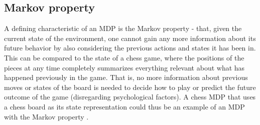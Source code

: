 \subsection{Markov property}

A defining characteristic of an MDP is the Markov property - that, given the
current state of the environment, one cannot gain any more information about
its future behavior by also considering the previous actions and states it has
been in. This can be compared to the state of a chess game, where the positions
of the pieces at any time completely summarizes everything relevant about what
has happened previously in the game. That is, no more information about
previous moves or states of the board is needed to decide how to play or
predict the future outcome of the game (disregarding psychological factors). A
chess MDP that uses a chess board as its state representation could thus be an
example of an MDP with the Markov property \parencite{altman2002applications}. 
